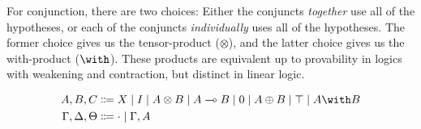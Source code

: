 For conjunction, there are two choices: Either the conjuncts \emph{together} use
all of the hypotheses, or each of the conjuncts \emph{individually} uses all of
the hypotheses.
The former choice gives us the tensor-product ($\otimes$), and the latter choice
gives us the with-product ($\with$).
These products are equivalent up to provability in logics with weakening and
contraction, but distinct in linear logic.

\begin{figure}
  \begin{align*}
    A, B, C &\Coloneqq X \mid I \mid A \otimes B \mid A \multimap B
              \mid 0 \mid A \oplus B \mid \top \mid A \with B \\
    \Gamma, \Delta, \Theta &\Coloneqq {\cdot} \mid \Gamma, A
  \end{align*}
\end{figure}

